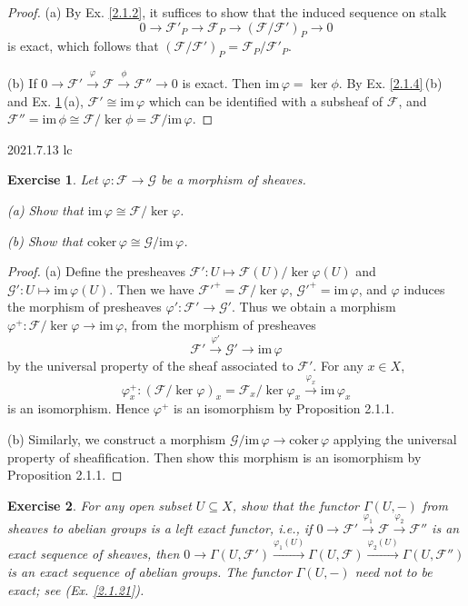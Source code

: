 \documentclass[12pt]{amsart}
\newtheorem{exe}{Exercise}[subsection]
\begin{document}
\begin{proof}
   (a) By Ex. \ref{2.1.2}, it suffices to show that the induced sequence on stalk$$0\to\mathscr{F}'_P\to\mathscr{F}_{P}\to(\mathscr{F}/\mathscr{F}')_{P}\to0$$is exact, which follows that $(\mathscr{F}/\mathscr{F}')_{P}=\mathscr{F}_P/\mathscr{F}'_P$.
   
   (b) If $0 \rightarrow \mathscr{F}' \xrightarrow{\varphi} \mathscr{F} \xrightarrow{\phi} \mathscr{F}'' \rightarrow 0$ is exact. Then $\mathrm{im}\,{\varphi} = \ker{\phi}$. By Ex. \ref{2.1.4}\,(b) and Ex. \ref{2.1.7}\,(a), $\mathscr{F}'\cong\mathrm{im}\,\varphi$ which can be identified with a subsheaf of $\mathscr{F}$, and $\mathscr{F}''=\mathrm{im}\,\phi\cong \mathscr{F}/\ker\phi=\mathscr{F}/\mathrm{im}\,\varphi$.
\end{proof}

2021.7.13 lc
\begin{exe}
	\label{2.1.7}
	Let $\varphi:\mathscr{F}\to\mathscr{G}$ be a morphism of sheaves.
	
	(a) Show that $\mathrm{im}\,\varphi\cong\mathscr{F}/\ker\varphi$.
	
	(b) Show that $\mathrm{coker}\,\varphi\cong\mathscr{G}/\mathrm{im}\,\varphi$.
\end{exe}

\begin{proof}
	(a) Define the presheaves $\mathscr{F}':U\mapsto\mathscr{F}(U)/\ker\varphi(U)$ and $\mathscr{G}':U\mapsto\mathrm{im}\,\varphi(U)$. Then we have $\mathscr{F}'^+=\mathscr{F}/\ker\varphi$, $\mathscr{G}'^+=\mathrm{im}\,\varphi$, and $\varphi$ induces the morphism of presheaves $\varphi':\mathscr{F}'\to\mathscr{G}'$. Thus we obtain a morphism $\varphi^+:\mathscr{F}/\ker\varphi\rightarrow\mathrm{im}\,\varphi$, from the morphism of presheaves $$\mathscr{F}'\xrightarrow{\varphi'}\mathscr{G}'{\rightarrow}\mathrm{im}\,\varphi$$by the universal property of the sheaf associated to $\mathscr{F}'$. For any $x\in X$, $$\varphi^+_x:(\mathscr{F}/\ker\varphi)_x=\mathscr{F}_x/\ker\varphi_x\stackrel{\varphi_x}{\rightarrow}\mathrm{im}\,\varphi_x$$is an isomorphism. Hence $\varphi^+$ is an isomorphism by Proposition 2.1.1.
	
	(b) Similarly, we construct a morphism $\mathscr{G}/\mathrm{im}\,\varphi\to\mathrm{coker}\,\varphi$ applying the universal property of sheafification. Then show this morphism is an isomorphism by Proposition 2.1.1.
\end{proof}

\begin{exe}
	\label{2.1.8}
	For any open subset $U\subseteq X$, show that the functor $\Gamma(U,-)$ from sheaves to abelian groups is a left exact functor, i.e., if $0{\rightarrow}\mathscr{F}'\xrightarrow{\varphi_1}\mathscr{F}\xrightarrow{\varphi_2}\mathscr{F}''$ is an exact sequence of sheaves, then $0{\rightarrow}\Gamma(U,\mathscr{F}')\xrightarrow{\varphi_1(U)}{}\Gamma(U,\mathscr{F})\xrightarrow{\varphi_2(U)}{}\Gamma(U,\mathscr{F}'')$ is an exact sequence of abelian groups. The functor $\Gamma(U,-)$ need not to be exact; see \textup{(Ex. \ref{2.1.21})}.
\end{exe}
\end{document}
